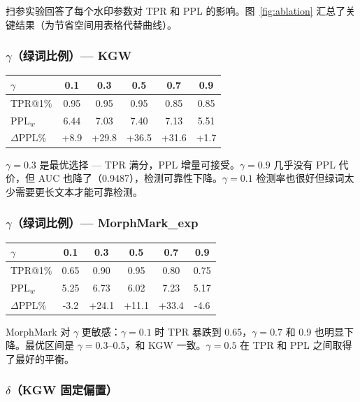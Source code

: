 \documentclass[11pt,a4paper]{article}
\begin{document}
扫参实验回答了每个水印参数对 TPR 和 PPL 的影响。图~\ref{fig:ablation} 汇总了关键结果（为节省空间用表格代替曲线）。

\subsubsection*{$\gamma$（绿词比例）— KGW}

\begin{table}[H]
\centering
\begin{tabular}{@{}lccccc@{}}
\toprule
$\gamma$ & 0.1 & 0.3 & 0.5 & 0.7 & 0.9 \\
\midrule
TPR@1\% & 0.95 & 0.95 & 0.95 & 0.85 & 0.85 \\
PPL$_w$ & 6.44 & 7.03 & 7.40 & 7.13 & 5.51 \\
$\Delta$PPL\% & +8.9 & +29.8 & +36.5 & +31.6 & +1.7 \\
\bottomrule
\end{tabular}
\end{table}

$\gamma=0.3$ 是最优选择 — TPR 满分，PPL 增量可接受。$\gamma=0.9$ 几乎没有 PPL 代价，但 AUC 也降了（0.9487），检测可靠性下降。$\gamma=0.1$ 检测率也很好但绿词太少需要更长文本才能可靠检测。

\subsubsection*{$\gamma$（绿词比例）— MorphMark\_exp}

\begin{table}[H]
\centering
\begin{tabular}{@{}lccccc@{}}
\toprule
$\gamma$ & 0.1 & 0.3 & 0.5 & 0.7 & 0.9 \\
\midrule
TPR@1\% & 0.65 & 0.90 & 0.95 & 0.80 & 0.75 \\
PPL$_w$ & 5.25 & 6.73 & 6.02 & 7.23 & 5.17 \\
$\Delta$PPL\% & -3.2 & +24.1 & +11.1 & +33.4 & -4.6 \\
\bottomrule
\end{tabular}
\end{table}

MorphMark 对 $\gamma$ 更敏感：$\gamma=0.1$ 时 TPR 暴跌到 0.65，$\gamma=0.7$ 和 0.9 也明显下降。最优区间是 $\gamma=0.3$--0.5，和 KGW 一致。$\gamma=0.5$ 在 TPR 和 PPL 之间取得了最好的平衡。

\subsubsection*{$\delta$（KGW 固定偏置）}
\end{document}
